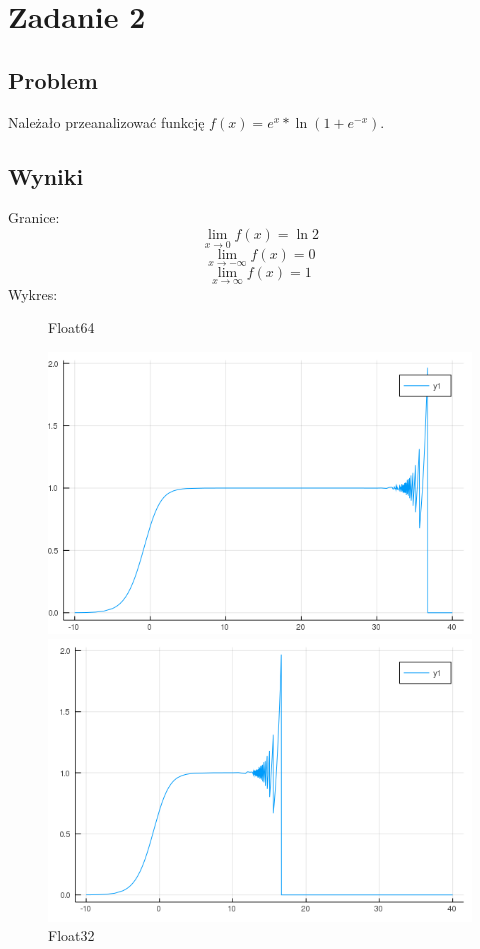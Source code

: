 \documentclass{article}
\begin{document}
\section{Zadanie 2}
\subsection{Problem}
Należało przeanalizować funkcję $f(x) = e^{x} * \ln{(1 + e^{-x})}$.
\subsection{Wyniki}
Granice:
\[ \lim_{x \to 0} f(x) = \ln{2}\]
\[ \lim_{x \to -\infty} f(x) = 0\]
\[ \lim_{x \to \infty} f(x) = 1\]
Wykres:

\begin{figure}[h]
  \begin{minipage}{0.48\textwidth}
    \centering
    \caption{Float64}
    \includegraphics[width=\linewidth]{plot-jl}
  \end{minipage}
  \begin{minipage}{0.48\textwidth}
    \centering
    \caption{Float32}
    \includegraphics[width=\linewidth]{plot-jl32}
  \end{minipage}
\end{figure}
\end{document}
